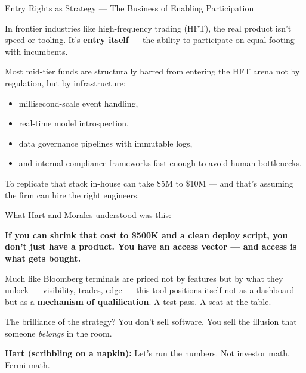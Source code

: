 \begin{TechnicalSidebar}{Entry Rights as Strategy — The Business of Enabling Participation}

In frontier industries like high-frequency trading (HFT), the real product isn’t speed or tooling.  
It’s \textbf{entry itself} — the ability to participate on equal footing with incumbents.

\medskip

Most mid-tier funds are structurally barred from entering the HFT arena not by regulation, but by infrastructure:

\medskip

\begin{itemize}
  \item millisecond-scale event handling,
  \item real-time model introspection,
  \item data governance pipelines with immutable logs,
  \item and internal compliance frameworks fast enough to avoid human bottlenecks.
\end{itemize}

\medskip

To replicate that stack in-house can take \$5M to \$10M — and that’s assuming the firm can hire the right engineers.

\medskip

What Hart and Morales understood was this:

\medskip

\textbf{If you can shrink that cost to \$500K and a clean deploy script, you don’t just have a product.  
You have an access vector — and access is what gets bought.}

\medskip

Much like Bloomberg terminals are priced not by features but by what they unlock — visibility, trades, edge —  
this tool positions itself not as a dashboard but as a \textbf{mechanism of qualification}.  
A test pass. A seat at the table.

\medskip

The brilliance of the strategy?  
You don’t sell software.  
You sell the illusion that someone \textit{belongs} in the room.

\end{TechnicalSidebar}

\medskip

\textbf{Hart (scribbling on a napkin):}  
Let’s run the numbers. Not investor math. Fermi math.

